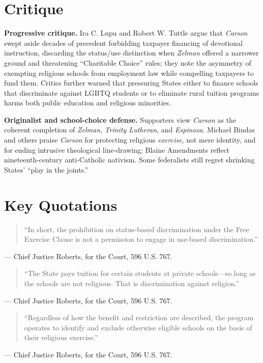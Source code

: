 \documentclass[12pt]{article}
\begin{document}
\section{Critique}

\textbf{Progressive critique.} Ira C. Lupu and Robert W. Tuttle argue that \textit{Carson} swept aside decades of precedent forbidding taxpayer financing of devotional instruction, discarding the status/use distinction when \textit{Zelman} offered a narrower ground and threatening ``Charitable Choice'' rules; they note the asymmetry of exempting religious schools from employment law while compelling taxpayers to fund them. Critics further warned that pressuring States either to finance schools that discriminate against LGBTQ students or to eliminate rural tuition programs harms both public education and religious minorities.

\textbf{Originalist and school-choice defense.} Supporters view \textit{Carson} as the coherent completion of \textit{Zelman}, \textit{Trinity Lutheran}, and \textit{Espinoza}. Michael Bindas and others praise \textit{Carson} for protecting religious \textit{exercise}, not mere identity, and for ending intrusive theological line-drawing; Blaine Amendments reflect nineteenth-century anti-Catholic nativism. Some federalists still regret shrinking States' ``play in the joints.''

\section{Key Quotations}

\begin{quote}
``In short, the prohibition on status-based discrimination under the Free Exercise Clause is not a permission to engage in use-based discrimination.''
\end{quote}
\noindent --- Chief Justice Roberts, for the Court, 596 U.S. 767.

\begin{quote}
``The State pays tuition for certain students at private schools---so long as the schools are not religious. That is discrimination against religion.''
\end{quote}
\noindent --- Chief Justice Roberts, for the Court, 596 U.S. 767.

\begin{quote}
``Regardless of how the benefit and restriction are described, the program operates to identify and exclude otherwise eligible schools on the basis of their religious exercise.''
\end{quote}
\noindent --- Chief Justice Roberts, for the Court, 596 U.S. 767.
\end{document}
